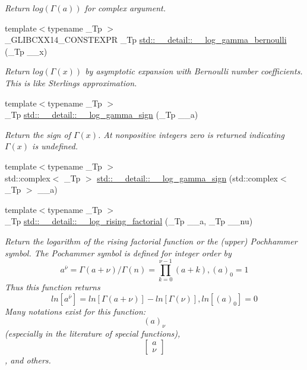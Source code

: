 \begin{DoxyCompactItemize}
\begin{DoxyCompactList}\small\item\em Return $ log(\Gamma(a)) $ for complex argument. \end{DoxyCompactList}\item 
{\footnotesize template$<$typename \+\_\+\+Tp $>$ }\\\+\_\+\+G\+L\+I\+B\+C\+X\+X14\+\_\+\+C\+O\+N\+S\+T\+E\+X\+PR \+\_\+\+Tp \hyperlink{namespacestd_1_1____detail_ac13e31ebcd3c99d6a7cad9010e039315}{std\+::\+\_\+\+\_\+detail\+::\+\_\+\+\_\+log\+\_\+gamma\+\_\+bernoulli} (\+\_\+\+Tp \+\_\+\+\_\+x)
\begin{DoxyCompactList}\small\item\em Return $log(\Gamma(x))$ by asymptotic expansion with Bernoulli number coefficients. This is like Sterling\textquotesingle{}s approximation. \end{DoxyCompactList}\item 
{\footnotesize template$<$typename \+\_\+\+Tp $>$ }\\\+\_\+\+Tp \hyperlink{namespacestd_1_1____detail_ab17ef141874b20a302d5c142cf304542}{std\+::\+\_\+\+\_\+detail\+::\+\_\+\+\_\+log\+\_\+gamma\+\_\+sign} (\+\_\+\+Tp \+\_\+\+\_\+a)
\begin{DoxyCompactList}\small\item\em Return the sign of $ \Gamma(x) $. At nonpositive integers zero is returned indicating $ \Gamma(x) $ is undefined. \end{DoxyCompactList}\item 
{\footnotesize template$<$typename \+\_\+\+Tp $>$ }\\std\+::complex$<$ \+\_\+\+Tp $>$ \hyperlink{namespacestd_1_1____detail_a4c87b679d9fa1ac20ebe3cb85becb266}{std\+::\+\_\+\+\_\+detail\+::\+\_\+\+\_\+log\+\_\+gamma\+\_\+sign} (std\+::complex$<$ \+\_\+\+Tp $>$ \+\_\+\+\_\+a)
\item 
{\footnotesize template$<$typename \+\_\+\+Tp $>$ }\\\+\_\+\+Tp \hyperlink{namespacestd_1_1____detail_a48998bae6619c9f63574af354b205074}{std\+::\+\_\+\+\_\+detail\+::\+\_\+\+\_\+log\+\_\+rising\+\_\+factorial} (\+\_\+\+Tp \+\_\+\+\_\+a, \+\_\+\+Tp \+\_\+\+\_\+nu)
\begin{DoxyCompactList}\small\item\em Return the logarithm of the rising factorial function or the (upper) Pochhammer symbol. The Pochammer symbol is defined for integer order by \[ a^{\overline{\nu}} = \Gamma(a + \nu) / \Gamma(n) = \prod_{k=0}^{\nu-1} (a + k), (a)_0 = 1 \] Thus this function returns \[ ln[a^{\overline{\nu}}] = ln[\Gamma(a + \nu)] - ln[\Gamma(\nu)], ln[(a)_0] = 0 \] Many notations exist for this function\+: \[ (a)_\nu \] (especially in the literature of special functions), \[ \left[ \begin{array}{c} a \\ \nu \end{array} \right] \], and others. \end{DoxyCompactList}\item 

\end{DoxyCompactItemize}
